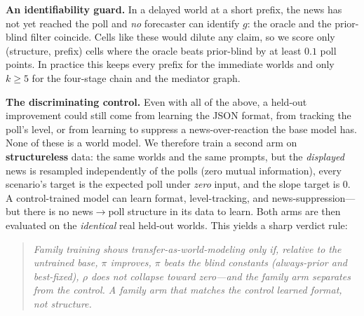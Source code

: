\begin{table}[h]
\centering
\caption{\textbf{The bracket, per held-out world}, computed on the identical episodes at each world's
$h^\star$ and over its informative prefixes. The oracle is a ceiling, not a bar: the references that
matter are the blind ones. Freezing $g$ at the range midpoint but using the disclosed structure
(prior-blind) already forecasts the direct chain to $2.07$ poll points, and the best single constant
response to $2.36$---so a low $\pi$ is not by itself evidence of inference. Note also how far apart the
worlds are: $\pi$ in the delayed worlds is three to four times that of the immediate ones, and the
recovery floors differ by $4\times$; this is why we neither pool $\pi$ nor pool raw $\varepsilon$.
\emph{Generated by \texttt{make\_tables.py}.}}
\label{tab:exp3-refs}
\footnotesize

\end{table}

\textbf{An identifiability guard.}  In a delayed world at a short prefix, the news has not yet reached
the poll and \emph{no} forecaster can identify $g$: the oracle and the prior-blind filter coincide. Cells
like these would dilute any claim, so we score only (structure, prefix) cells where the oracle beats
prior-blind by at least $0.1$ poll points. In practice this keeps every prefix for the immediate worlds
and only $k\geq5$ for the four-stage chain and the mediator graph.

\textbf{The discriminating control.}  Even with all of the above, a held-out improvement could still come
from learning the JSON format, from tracking the poll's level, or from learning to suppress a
news-over-reaction the base model has. None of these is a world model. We therefore train a second arm
on \textbf{structureless} data: the same worlds and the same prompts, but the \emph{displayed} news is
resampled independently of the polls (zero mutual information), every scenario's target is the expected
poll under \emph{zero} input, and the slope target is $0$. A control-trained model can learn format,
level-tracking, and news-suppression---but there is no news$\to$poll structure in its data to learn. Both
arms are then evaluated on the \emph{identical} real held-out worlds. This yields a sharp verdict rule:

\begin{quote}
\emph{Family training shows transfer-as-world-modeling only if, relative to the untrained base, $\pi$
improves, $\pi$ beats the blind constants (always-prior and best-fixed), $\rho$ does not collapse toward
zero---and the family arm separates from the control. A family arm that matches the control
learned format, not structure.}
\end{quote}

